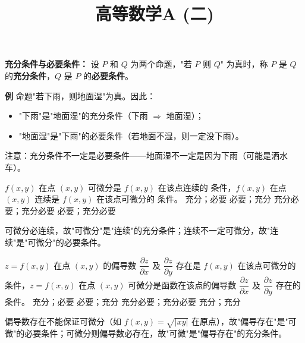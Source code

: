 \documentclass[answer]{THUExam}
\title{高等数学A (二)}
\author{}
\begin{document}
\vspace{1cm}
\makehead

\vspace{1cm}


\begin{note}
\textbf{充分条件与必要条件：} 设 $P$ 和 $Q$ 为两个命题，"若 $P$ 则 $Q$" 为真时，称 $P$ 是 $Q$ 的\textbf{充分条件}，$Q$ 是 $P$ 的\textbf{必要条件}。

\textbf{例} 命题"若下雨，则地面湿"为真。因此：
\begin{itemize}
	\item "下雨"是"地面湿"的充分条件（下雨 $\Rightarrow$ 地面湿）；
	\item "地面湿"是"下雨"的必要条件（若地面不湿，则一定没下雨）。
\end{itemize}
注意：充分条件不一定是必要条件——地面湿不一定是因为下雨（可能是洒水车）。
\end{note}
\bigskip

\begin{problem}
$f(x,y)$ 在点 $(x,y)$ 可微分是 $f(x,y)$ 在该点连续的 \underline{\hspace{2em}} 条件，$f(x,y)$ 在点 $(x,y)$ 连续是 $f(x,y)$ 在该点可微分的 \underline{\hspace{2em}} 条件。
\options
{充分；必要}
{必要；充分}
{充分必要；充分必要}
{必要；充分必要}
\end{problem}
\begin{note}
可微分必连续，故"可微分"是"连续"的充分条件；连续不一定可微分，故"连续"是"可微分"的必要条件。
\end{note}
\bigskip

\begin{problem}
$z=f(x,y)$ 在点 $(x,y)$ 的偏导数 $\dfrac{\partial z}{\partial x}$ 及 $\dfrac{\partial z}{\partial y}$ 存在是 $f(x,y)$ 在该点可微分的 \underline{\hspace{2em}} 条件，$z=f(x,y)$ 在点 $(x,y)$ 可微分是函数在该点的偏导数 $\dfrac{\partial z}{\partial x}$ 及 $\dfrac{\partial z}{\partial y}$ 存在的 \underline{\hspace{2em}} 条件。
\options
{充分；必要}
{必要；充分}
{充分必要；充分必要}
{充分；充分}
\end{problem}
\begin{note}
偏导数存在不能保证可微分（如 $f(x,y)=\sqrt{|xy|}$ 在原点），故"偏导存在"是"可微"的必要条件；可微分则偏导数必存在，故"可微"是"偏导存在"的充分条件。
\end{note}
\bigskip
\end{document}
